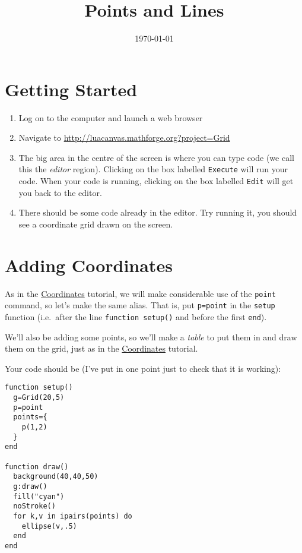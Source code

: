 \documentclass[
  xhtml,%
  use filename%
]{internet}
\title{Points and Lines}
\date{\today}
\begin{document}
\maketitle

\section{Getting Started}

\begin{enumerate}
\item Log on to the computer and launch a web browser
\item Navigate to \href{http://luacanvas.mathforge.org?project=Grid}{http://luacanvas.mathforge.org?project=Grid}
\item The big area in the centre of the screen is where you can type code (we call this the \emph{editor} region).
Clicking on the box labelled \verb+Execute+ will run your code.
When your code is running, clicking on the box labelled \verb+Edit+ will get you back to the editor.

\item There should be some code already in the editor.
Try running it, you should see a coordinate grid drawn on the screen.
\end{enumerate}

\section{Adding Coordinates}

As in the \href{Coordinates.xhtml}{Coordinates} tutorial, we will make considerable use of the \verb+point+ command, so let's make the same alias.
That is, put \verb+p=point+ in the \verb+setup+ function (i.e.\ after the line \verb+function setup()+ and before the first \verb+end+).

We'll also be adding some points, so we'll make a \emph{table} to put them in and draw them on the grid, just as in the \href{Coordinates.xhtml}{Coordinates} tutorial.

Your code should be (I've put in one point just to check that it is working):

\begin{verbatim}
function setup()
  g=Grid(20,5)
  p=point
  points={
    p(1,2)
  }
end

function draw()
  background(40,40,50)
  g:draw()
  fill("cyan")
  noStroke()
  for k,v in ipairs(points) do
    ellipse(v,.5)
  end
end
\end{verbatim}
\end{document}
